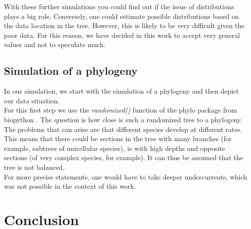       With these further simulations you could find out if the issue of distributions plays a big role. 
        Conversely, one could estimate possible distributions based on the data location in the tree. 
        However, this is likely to be very difficult given the poor data. For this reason, we have 
        decided in this work to accept very general values and not to speculate much. \\

    \subsection{Simulation of a phylogeny} \label{sec:discussion - simulate phylogeny}
      In our simulation, we start with the simulation of a phylogeny and then depict our data situation. \\
      For this first step we use the \textit{randomized()} function of the phylo package from biopython
        \cite{Cock2009}. The question is how close is such a randomized tree to a phylogeny. \\
      
      The problems that can arise are that different species develop at different rates. This means that 
        there could be sections in the tree with many branches (for example, subtrees of unicellular 
        species), ie with high depths and opposite sections (of very complex species, for example). It 
        can thus be assumed that the tree is not balanced. \\
      For more precise statements, one would have to take deeper undercurrents, which was not possible 
        in the context of this work.

  \section{Conclusion}

